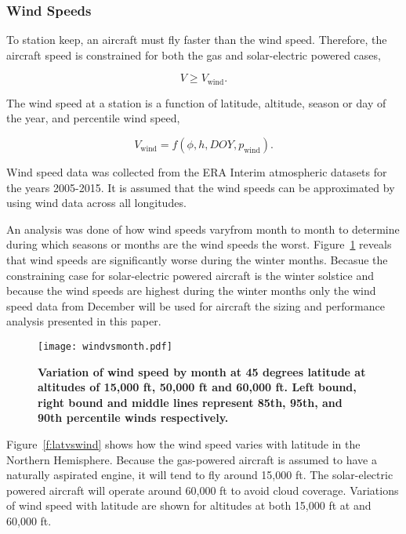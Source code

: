 \documentclass[]{aiaa-tc}%
\begin{document}
\subsubsection{Wind Speeds}

To station keep, an aircraft must fly faster than the wind speed.  
Therefore, the aircraft speed is constrained for both the gas and solar-electric powered cases,

\begin{equation}
    \label{e:availreq}
    V \geq V_{\text{wind}}.
\end{equation}

The wind speed at a station is a function of latitude, altitude, season or day of the year, and percentile wind speed,

\begin{equation}
    \label{e:windspeed}
    V_{\text{wind}} = f(\phi, h, DOY, p_{\text{wind}}).
    \end{equation}

Wind speed data was collected from the ERA Interim atmospheric datasets for the years 2005-2015.\cite{wind} 
It is assumed that the wind speeds can be approximated by using wind data across all longitudes. 

An analysis was done of how wind speeds varyfrom month to month to determine during which seasons or months are the wind speeds the worst. Figure~\ref{f:windvsmonth} reveals that wind speeds are significantly worse during the winter months. 
Becasue the constraining case for solar-electric powered aircraft is the winter solstice and because the wind speeds are highest during the winter months only the wind speed data from December will be used for aircraft the sizing and performance analysis presented in this paper. 

\begin{figure}[H]
	\begin{center}
	\texttt{[image: windvsmonth.pdf]}
    \caption{ \textbf{ Variation of wind speed by month at 45 degrees latitude at altitudes of 15,000 ft, 50,000 ft and 60,000 ft.  Left bound, right bound and middle lines represent 85th, 95th, and 90th percentile winds respectively. }}
	\label{f:windvsmonth}
	\end{center}
\end{figure}

Figure~\ref{f:latvswind} shows how the wind speed varies with latitude in the Northern Hemisphere. 
Because the gas-powered aircraft is assumed to have a naturally aspirated engine, it will tend to fly around 15,000 ft.  
The solar-electric powered aircraft will operate around 60,000 ft to avoid cloud coverage.  
Variations of wind speed with latitude are shown for altitudes at both 15,000 ft at and 60,000 ft.  \\
\end{document}
